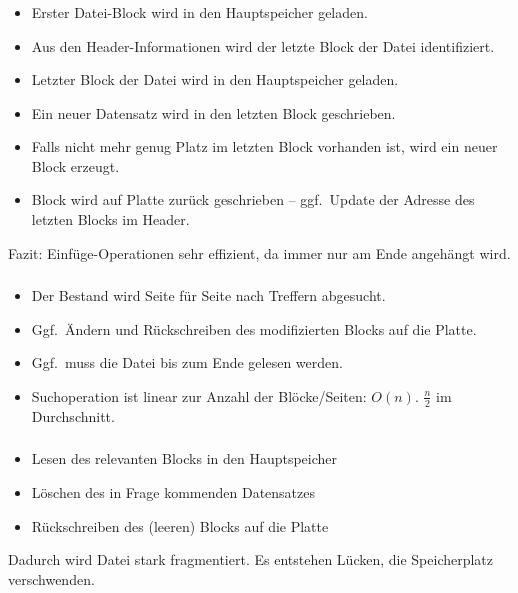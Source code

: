 \begin{frame}
\frametitle{\insertsection}
\framesubtitle{\insertsubsection}
\begin{itemize}
	\item Erster Datei-Block wird in den Hauptspeicher geladen.\\[4pt]
	\item Aus den Header-Informationen wird der letzte Block der Datei identifiziert.\\[4pt]
	\item Letzter Block der Datei wird in den Hauptspeicher geladen. \\[4pt]
	\item Ein neuer Datensatz wird in den letzten Block geschrieben. \\[4pt]
	\item Falls nicht mehr genug Platz im letzten Block vorhanden ist, wird ein neuer Block erzeugt.\\[4pt]
	\item Block wird auf Platte zur\"uck geschrieben -- ggf.~Update der Adresse des letzten Blocks im Header.\\[4pt]
\end{itemize}
\pause
Fazit: Einf\"uge-Operationen sehr effizient, da immer nur am Ende angeh\"angt wird.
\end{frame}

\begin{frame}
\frametitle{\insertsection}
\framesubtitle{\insertsubsection}
\begin{itemize}
	\item Der Bestand wird Seite für Seite nach Treffern abgesucht. 
	\item Ggf.~\"Andern und R\"uckschreiben des modifizierten Blocks auf die Platte.
	\item Ggf.~muss die Datei bis zum Ende gelesen werden.
	\item Suchoperation ist linear zur Anzahl der Bl\"ocke/Seiten: $O(n)$. $\frac{n}{2}$ im Durchschnitt.
\end{itemize}
\end{frame}

\begin{frame}
\frametitle{\insertsection}
\framesubtitle{\insertsubsection}
\begin{itemize}
	\item Lesen des relevanten Blocks in den Hauptspeicher 
	\item L\"oschen des in Frage kommenden Datensatzes 
	\item R\"uckschreiben des (leeren) Blocks auf die Platte
\end{itemize}
\abs
\pause
\alert{Dadurch wird Datei stark fragmentiert. Es entstehen Lücken, die Speicherplatz verschwenden.}
\end{frame}

